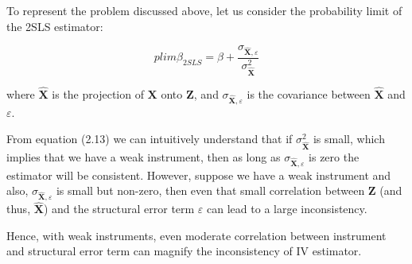 To represent the problem discussed above, let us consider the probability limit of the 2SLS estimator:

\begin{equation}
plim \hat{\beta} _{2SLS}=\beta + \frac{\sigma _{\mathbf {\hat X},\varepsilon }}{\sigma _{\mathbf {\hat X}}^{2}}
\end{equation}

where $\mathbf {\hat X}$ is the projection of $\mathbf X$ onto $\mathbf Z$, and ${\sigma _{\mathbf {\hat X},\varepsilon }}$ is the covariance between $\mathbf {\hat X}$ and $\varepsilon$.

From equation (2.13) we can intuitively understand that if $\sigma _{\mathbf {\hat X}}^{2}$ is small, which implies that we have a weak instrument, then as long as ${\sigma _{\mathbf {\hat X},\varepsilon }}$ is zero the estimator will be consistent. However, suppose we have a weak instrument  and also, ${\sigma _{\mathbf {\hat X},\varepsilon }}$ is small but non-zero, then even that small correlation between $\mathbf Z$ (and thus, $\mathbf {\hat X}$) and the structural error term $\varepsilon$ can lead to a large inconsistency.

Hence, with weak instruments, even moderate correlation between instrument and structural error term can magnify the inconsistency of IV estimator. 